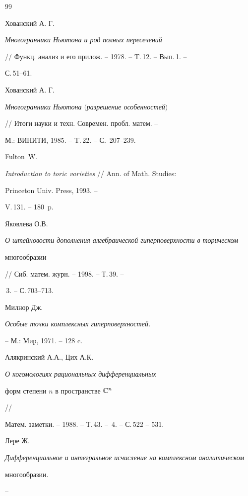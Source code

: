 \begin{thebibliography}{99}







Хованский А. Г.


{\it Многогранники Ньютона и род полных пересечений}


// Функц. анализ и его прилож. -- 1978. -- T.\,12. -- Вып.\,1. --


С.\,51--61.




Хованский А. Г.


{\it Многогранники Ньютона $($разрешение особенностей$)$}


// Итоги науки и техн. Современ. пробл. матем. --


М.: ВИНИТИ, 1985. -- T.\,22. -- С.~207--239.




Fulton~W.


{\it Introduction to toric varieties} // Ann. of Math. Studies:


Princeton Univ. Press, 1993. --


V.\,131. -- 180~p.




Яковлева О.В.


{\it О штейновости дополнения алгебраической гиперповерхности в торическом


многообразии} // Сиб. матем. журн. -- 1998. -- Т.\,39. --


\No\,3. -- С.\,703--713.




Милнор Дж.


{\it Особые точки комплексных гиперповерхностей.}


-- М.: Мир, 1971. -- 128 c.




Алякринский А.А., Цих А.К. {\it О когомологиях рациональных дифференциальных


форм степени $n$ в пространстве $\Bbb C^n$} //


Матем. заметки. -- 1988. -- Т.\,43. -- \No\,4. -- С.\,522 -- 531.




Лере Ж.


{\it Дифференциальное и интегральное исчисление на комплексном аналитическом


многообразии.} --



\end{thebibliography}
